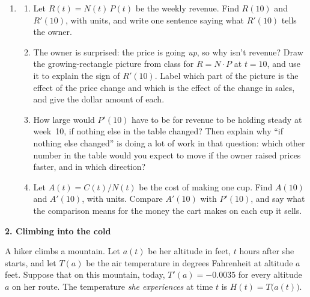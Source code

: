 \documentclass[11pt]{article}
\newcommand{\prob}[1]{\medskip\noindent\textbf{\large #1}\par\smallskip}
\begin{document}
\begin{enumerate}[resume]
\item[]
\begin{enumerate}
\item Let $R(t) = N(t)\,P(t)$ be the weekly revenue. Find $R(10)$ and $R'(10)$, with
units, and write one sentence saying what $R'(10)$ tells the owner.

\item The owner is surprised: the price is going \emph{up}, so why isn't revenue? Draw the
growing-rectangle picture from class for $R = N\cdot P$ at $t=10$, and use it to explain
the sign of $R'(10)$. Label which part of the picture is the effect of the price change
and which is the effect of the change in sales, and give the dollar amount of each.

\item How large would $P'(10)$ have to be for revenue to be holding steady at week~10, if
nothing else in the table changed? Then explain why ``if nothing else changed'' is
doing a lot of work in that question: which other number in the table would you expect
to move if the owner raised prices faster, and in which direction?

\item Let $A(t) = C(t)/N(t)$ be the cost of making one cup. Find $A(10)$ and $A'(10)$, with
units. Compare $A'(10)$ with $P'(10)$, and say what the comparison means for the money
the cart makes on each cup it sells.
\end{enumerate}
\end{enumerate}

\prob{2. Climbing into the cold}

A hiker climbs a mountain. Let $a(t)$ be her altitude in feet, $t$ hours after she
starts, and let $T(a)$ be the air temperature in degrees Fahrenheit at altitude $a$
feet. Suppose that on this mountain, today, $T'(a) = -0.0035$ for every altitude $a$ on
her route. The temperature \emph{she experiences} at time $t$ is $H(t) = T\big(a(t)\big)$.
\end{document}

